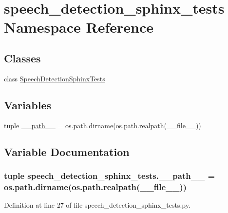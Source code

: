 \hypertarget{namespacespeech__detection__sphinx__tests}{\section{speech\-\_\-detection\-\_\-sphinx\-\_\-tests Namespace Reference}
\label{namespacespeech__detection__sphinx__tests}
}
\subsection*{Classes}
\begin{DoxyCompactItemize}
\item 
class \hyperlink{classspeech__detection__sphinx__tests_1_1SpeechDetectionSphinxTests}{Speech\-Detection\-Sphinx\-Tests}
\end{DoxyCompactItemize}
\subsection*{Variables}
\begin{DoxyCompactItemize}
\item 
tuple \hyperlink{namespacespeech__detection__sphinx__tests_a0c7ae60e38260decd492a5ba5fe6a220}{\-\_\-\-\_\-path\-\_\-\-\_\-} = os.\-path.\-dirname(os.\-path.\-realpath(\-\_\-\-\_\-file\-\_\-\-\_\-))
\end{DoxyCompactItemize}


\subsection{Variable Documentation}
\hypertarget{namespacespeech__detection__sphinx__tests_a0c7ae60e38260decd492a5ba5fe6a220}{
\subsubsection[{\-\_\-\-\_\-path\-\_\-\-\_\-}]{\setlength{\rightskip}{0pt plus 5cm}tuple speech\-\_\-detection\-\_\-sphinx\-\_\-tests.\-\_\-\-\_\-path\-\_\-\-\_\- = os.\-path.\-dirname(os.\-path.\-realpath(\-\_\-\-\_\-file\-\_\-\-\_\-))}}\label{namespacespeech__detection__sphinx__tests_a0c7ae60e38260decd492a5ba5fe6a220}


Definition at line 27 of file speech\-\_\-detection\-\_\-sphinx\-\_\-tests.\-py.

